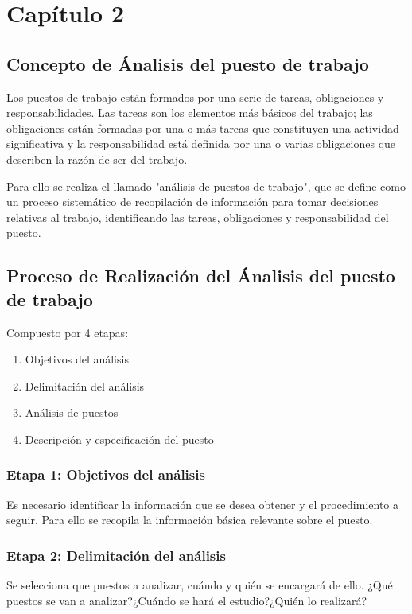 \chapter{Capítulo 2}

\section{Concepto de Ánalisis del puesto de trabajo}
Los puestos de trabajo están formados por una serie de tareas, obligaciones 
y responsabilidades. Las tareas son los elementos más básicos del trabajo; las obligaciones
 están formadas por una o más tareas que constituyen una actividad significativa 
 y la responsabilidad está definida por una o varias obligaciones que describen la razón de ser del trabajo.

 Para ello se realiza el llamado "análisis de puestos de trabajo", que se define
 como un proceso sistemático de recopilación de información para tomar decisiones relativas al trabajo,
 identificando las tareas, obligaciones y responsabilidad del puesto.

\section{Proceso de Realización del Ánalisis del puesto de trabajo}
Compuesto por 4 etapas:
\begin{enumerate}[label=(\Roman*)]
    \item Objetivos del análisis
    \item Delimitación del análisis
    \item Análisis de puestos
    \item Descripción y especificación del puesto
\end{enumerate}

\subsection{Etapa 1: Objetivos del análisis}
Es necesario identificar la información que se desea obtener y el procedimiento a seguir. Para ello
se recopila la información básica relevante sobre el puesto.
\subsection{Etapa 2: Delimitación del análisis}
Se selecciona que puestos a analizar, cuándo y quién se encargará de ello.
¿Qué puestos se van a analizar?¿Cuándo se hará el estudio?¿Quién lo realizará?


